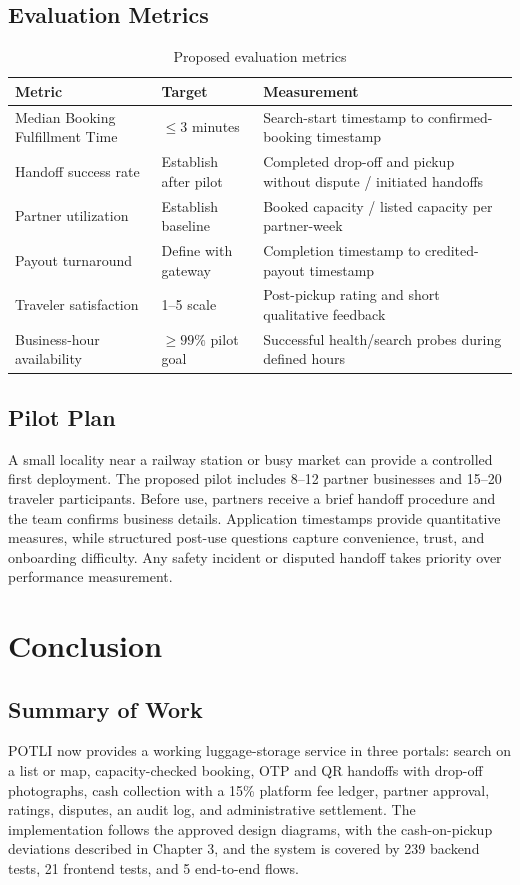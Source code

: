 \documentclass{tietreport}
\begin{document}
\section{Evaluation Metrics}
\begin{table}[H]
\centering
\begin{tabular}{P{0.30\textwidth}P{0.20\textwidth}P{0.40\textwidth}}
\toprule
\textbf{Metric} & \textbf{Target} & \textbf{Measurement} \\
\midrule
Median Booking Fulfillment Time & $\leq 3$ minutes & Search-start timestamp to confirmed-booking timestamp \\
Handoff success rate & Establish after pilot & Completed drop-off and pickup without dispute / initiated handoffs \\
Partner utilization & Establish baseline & Booked capacity / listed capacity per partner-week \\
Payout turnaround & Define with gateway & Completion timestamp to credited-payout timestamp \\
Traveler satisfaction & 1--5 scale & Post-pickup rating and short qualitative feedback \\
Business-hour availability & $\geq 99\%$ pilot goal & Successful health/search probes during defined hours \\
\bottomrule
\end{tabular}
\caption{Proposed evaluation metrics}
\label{tab:metrics}
\end{table}

\section{Pilot Plan}
A small locality near a railway station or busy market can provide a controlled first deployment. The proposed pilot includes 8--12 partner businesses and 15--20 traveler participants. Before use, partners receive a brief handoff procedure and the team confirms business details. Application timestamps provide quantitative measures, while structured post-use questions capture convenience, trust, and onboarding difficulty. Any safety incident or disputed handoff takes priority over performance measurement.

\chapter{Conclusion}

\section{Summary of Work}
POTLI now provides a working luggage-storage service in three portals: search on a list or map, capacity-checked booking, OTP and QR handoffs with drop-off photographs, cash collection with a 15\% platform fee ledger, partner approval, ratings, disputes, an audit log, and administrative settlement. The implementation follows the approved design diagrams, with the cash-on-pickup deviations described in Chapter 3, and the system is covered by 239 backend tests, 21 frontend tests, and 5 end-to-end flows.
\end{document}
